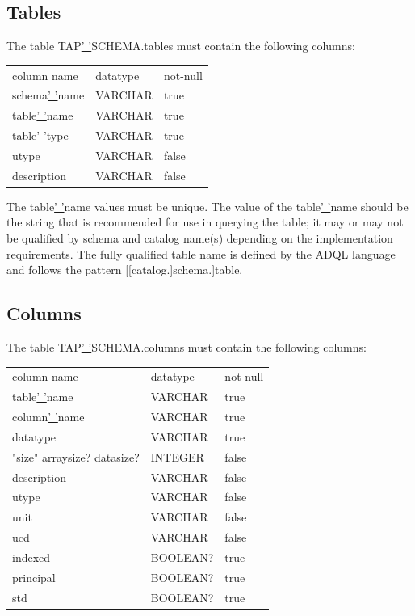 \documentclass[11pt,letter]{ivoa}
\begin{document}
{\subsection{Tables}
\label{sec:tap-schema-tables}
The table TAP\underline{' '}SCHEMA.tables must contain the following columns:

\begin{tabular}{l l l}
\label{tab:tap-schema-tables}
column name & datatype & not-null \\
schema\underline{' '}name & VARCHAR & true \\
table\underline{' '}name & VARCHAR & true \\
table\underline{' '}type & VARCHAR & true \\
utype & VARCHAR & false \\
description & VARCHAR & false \\
\end{tabular}

The table\underline{' '}name values must be unique. The value of the 
table\underline{' '}name should be the string that is recommended for use in 
querying the table; it may or may not be qualified by schema and catalog name(s) 
depending on the implementation requirements. The fully qualified table name is 
defined by the ADQL language and follows the pattern [[catalog.]schema.]table. 

\subsection{Columns}
\label{sec:tap-schema-columns}
The table TAP\underline{' '}SCHEMA.columns must contain the following columns:

\begin{tabular}{l l l}
\label{tab:tap-schema-columns}
column name & datatype & not-null \\
table\underline{' '}name & VARCHAR & true \\
column\underline{' '}name & VARCHAR & true \\
datatype & VARCHAR & true \\
"size" arraysize? datasize? & INTEGER & false \\
description & VARCHAR & false \\
utype & VARCHAR & false \\
unit & VARCHAR & false \\
ucd & VARCHAR & false \\
indexed & BOOLEAN? & true \\
principal & BOOLEAN? & true \\
std & BOOLEAN? & true \\
\end{tabular}

}
\end{document}
